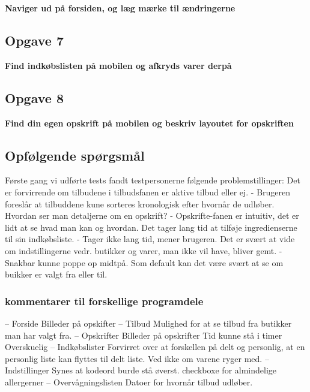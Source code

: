 \textbf{Naviger ud på forsiden, og læg mærke til ændringerne}

\subsection{Opgave 7}
\textbf{Find indkøbslisten på mobilen og afkryds varer derpå}

\subsection{Opgave 8}
\textbf{Find din egen opskrift på mobilen og beskriv layoutet for opskriften}


\subsection{Opfølgende spørgsmål}
Første gang vi udførte tests fandt testpersonerne følgende problemstillinger:
Det er forvirrende om tilbudene i tilbudsfanen er aktive tilbud eller ej.
 - Brugeren foreslår at tilbuddene kune sorteres kronologisk efter hvornår de udløber.
Hvordan ser man detaljerne om en opskrift?
 - Opskrifte-fanen er intuitiv, det er lidt at se hvad man kan og hvordan.
Det tager lang tid at tilføje ingredienserne til sin indkøbsliste.
 - Tager ikke lang tid, mener brugeren.
Det er svært at vide om indstillingerne vedr. butikker og varer, man ikke vil have, bliver gemt.
 - Snakbar kunne poppe op midtpå. Som default kan det være svært at se om buikker er valgt fra eller til.
\subsubsection{kommentarer til forskellige programdele}
– Forside
	Billeder på opskifter
– Tilbud
	Mulighed for at se tilbud fra butikker man har valgt fra.
– Opskrifter
	Billeder på opskrifter
	Tid kunne stå i timer
	Overskuelig
– Indkøbslister
	Forvirret over at forskellen på delt og personlig, at en personlig liste kan flyttes til delt liste. Ved ikke om varene ryger med.
– Indstillinger
Synes at kodeord burde stå øverst.
checkboxe for almindelige allergerner
– Overvågningslisten
	Datoer for hvornår tilbud udløber.

